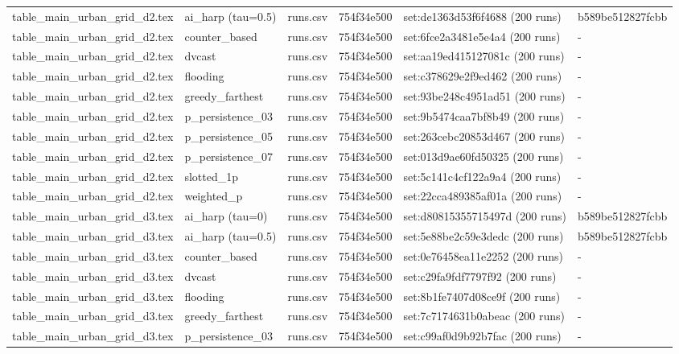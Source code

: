 \begin{tabular}{llllll}
table\_main\_urban\_grid\_d2.tex & ai\_harp (tau=0.5) & runs.csv & 754f34e500 & set:de1363d53f6f4688 (200 runs) & b589be512827fcbb \\
table\_main\_urban\_grid\_d2.tex & counter\_based & runs.csv & 754f34e500 & set:6fce2a3481e5e4a4 (200 runs) & - \\
table\_main\_urban\_grid\_d2.tex & dvcast & runs.csv & 754f34e500 & set:aa19ed415127081c (200 runs) & - \\
table\_main\_urban\_grid\_d2.tex & flooding & runs.csv & 754f34e500 & set:c378629e2f9ed462 (200 runs) & - \\
table\_main\_urban\_grid\_d2.tex & greedy\_farthest & runs.csv & 754f34e500 & set:93be248c4951ad51 (200 runs) & - \\
table\_main\_urban\_grid\_d2.tex & p\_persistence\_03 & runs.csv & 754f34e500 & set:9b5474caa7bf8b49 (200 runs) & - \\
table\_main\_urban\_grid\_d2.tex & p\_persistence\_05 & runs.csv & 754f34e500 & set:263cebc20853d467 (200 runs) & - \\
table\_main\_urban\_grid\_d2.tex & p\_persistence\_07 & runs.csv & 754f34e500 & set:013d9ae60fd50325 (200 runs) & - \\
table\_main\_urban\_grid\_d2.tex & slotted\_1p & runs.csv & 754f34e500 & set:5c141c4cf122a9a4 (200 runs) & - \\
table\_main\_urban\_grid\_d2.tex & weighted\_p & runs.csv & 754f34e500 & set:22cca489385af01a (200 runs) & - \\
table\_main\_urban\_grid\_d3.tex & ai\_harp (tau=0) & runs.csv & 754f34e500 & set:d80815355715497d (200 runs) & b589be512827fcbb \\
table\_main\_urban\_grid\_d3.tex & ai\_harp (tau=0.5) & runs.csv & 754f34e500 & set:5e88be2c59e3dedc (200 runs) & b589be512827fcbb \\
table\_main\_urban\_grid\_d3.tex & counter\_based & runs.csv & 754f34e500 & set:0e76458ea11e2252 (200 runs) & - \\
table\_main\_urban\_grid\_d3.tex & dvcast & runs.csv & 754f34e500 & set:c29fa9fdf7797f92 (200 runs) & - \\
table\_main\_urban\_grid\_d3.tex & flooding & runs.csv & 754f34e500 & set:8b1fe7407d08ce9f (200 runs) & - \\
table\_main\_urban\_grid\_d3.tex & greedy\_farthest & runs.csv & 754f34e500 & set:7c7174631b0abeac (200 runs) & - \\
table\_main\_urban\_grid\_d3.tex & p\_persistence\_03 & runs.csv & 754f34e500 & set:c99af0d9b92b7fac (200 runs) & - \\

\end{tabular}
